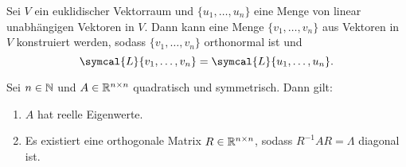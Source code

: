 \begin{repitition}\label{gram}
    Sei \(V\) ein euklidischer Vektorraum und \(\{u_1,\ldots,u_n\}\) eine Menge von linear unabhängigen Vektoren in \(V\). 
    Dann kann eine Menge \(\{v_1,\ldots,v_n\}\) aus Vektoren in \(V\)  konstruiert werden, sodass \(\{v_1,\ldots,v_n\}\) orthonormal ist und 
    \begin{equation*}
        \symcal{L}\{v_1,\ldots,v_n\} = \symcal{L}\{u_1,\ldots,u_n\}.
    \end{equation*}
\end{repitition}
\begin{theorem}[Spektralsatz]\label{spec}
    Sei \(n \in \mathbb{N}\) und \(A \in \mathbb{R}^{n \times n} \) quadratisch und symmetrisch. 
    Dann gilt:
    \begin{enumerate}[label= (\roman*)]
        \item \(A\) hat reelle Eigenwerte.\label{spec1}
        \item Es existiert eine orthogonale Matrix \(R \in \mathbb{R}^{n \times n}\), sodass \(R^{-1}AR = \Lambda\) diagonal ist.\label{spec2}
    \end{enumerate}
\end{theorem}
